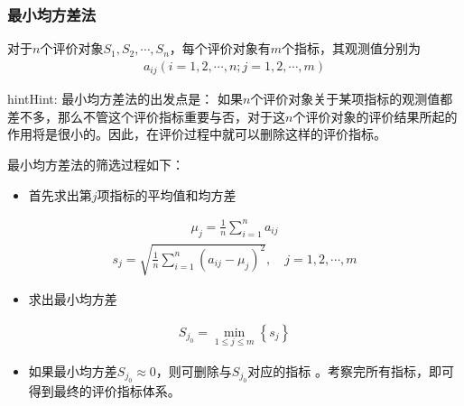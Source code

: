 \documentclass[letterpaper,10pt,english]{sphinxmanual}
\begin{document}
\subsubsection{最小均方差法}
\label{\detokenize{docs/evaluation_model:id5}}
对于\(n\)个评价对象\(S_{1}, S_{2}, \cdots, S_{n}\)，每个评价对象有\(m\)个指标，其观测值分别为
\begin{equation*}
\begin{split}
a_{i j}(i=1,2, \cdots, n ; j=1,2, \cdots, m)
\end{split}
\end{equation*}
\begin{sphinxadmonition}{hint}{Hint:}
最小均方差法的出发点是： 如果\(n\)个评价对象关于某项指标的观测值都差不多，那么不管这个评价指标重要与否，对于这\(n\)个评价对象的评价结果所起的作用将是很小的。因此，在评价过程中就可以删除这样的评价指标。
\end{sphinxadmonition}

最小均方差法的筛选过程如下：
\begin{itemize}
\item {} 
首先求出第\(j\)项指标的平均值和均方差

\end{itemize}
\begin{equation*}
\begin{split}
\mu_{j}=\frac{1}{n} \sum_{i=1}^{n} a_{i j}
\end{split}
\end{equation*}\begin{equation*}
\begin{split}
s_{j}=\sqrt{\frac{1}{n} \sum_{i=1}^{n}\left(a_{i j}-\mu_{j}\right)^{2}}, \quad j=1,2, \cdots, m
\end{split}
\end{equation*}\begin{itemize}
\item {} 
求出最小均方差

\end{itemize}
\begin{equation*}
\begin{split}
{S}_{j_{0}}=\min _{1 \leq j \leq m}\left\{{s}_{j}\right\}
\end{split}
\end{equation*}\begin{itemize}
\item {} 
如果最小均方差\(S_{j_{0}} \approx 0\)，则可删除与\(S_{j_{0}}\)对应的指标 。考察完所有指标，即可得到最终的评价指标体系。

\end{itemize}
\end{document}
